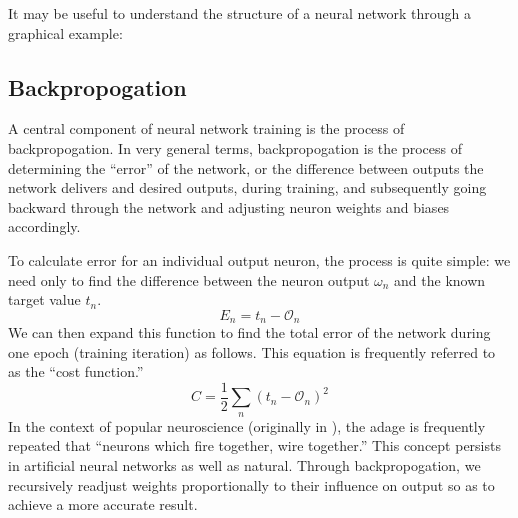 \documentclass{article}
\begin{document}
It may be useful to understand the structure of a neural network through a graphical example:
\begin{center}
\end{center}

\subsection{Backpropogation}
A central component of neural network training is the process of backpropogation. In very general terms, backpropogation is the process of determining the ``error'' of the network, or the difference between outputs the network delivers and desired outputs, during training, and subsequently going backward through the network and adjusting neuron weights and biases accordingly.

To calculate error for an individual output neuron, the process is quite simple: we need only to find the difference between the neuron output $\omega_n$ and the known target value $t_n$.
$$E_n=t_n-\mathcal{O}_n$$
We can then expand this function to find the total error of the network during one epoch (training iteration) as follows. This equation is frequently referred to as the ``cost function.'' \cite{mediummlbasics}
$$C=\frac{1}{2}\sum_n(t_n-\mathcal{O}_n)^2$$
In the context of popular neuroscience (originally in \cite{neuronsfire}), the adage is frequently repeated that ``neurons which fire together, wire together.'' This concept persists in artificial neural networks as well as natural. Through backpropogation, we recursively readjust weights proportionally to their influence on output so as to achieve a more accurate result.
\end{document}
